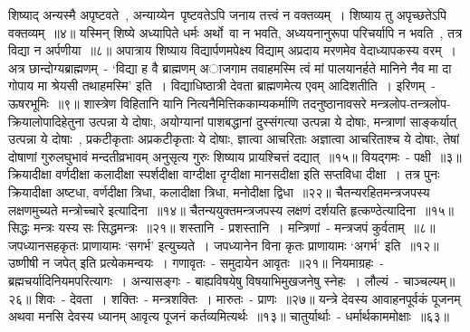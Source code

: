 \indent  शिष्याद् अन्यस्मै अपृष्टवते~, अन्याय्येन\footB\ पृष्टवतेऽपि जनाय तत्त्वं न वक्तव्यम्~। शिष्याय तु अपृच्छतेऽपि वक्तव्यम्~॥४॥
\indent  यस्मिन् शिष्ये अध्यापिते धर्मः अर्थो\footB\  वा न भवति, अध्ययनानुरूपा परिचर्यापि न भवति~, तत्र विद्या न अर्पणीया~॥८॥
\indent  अपात्राय शिष्याय विद्यार्पणमपेक्ष्य  विद्याम् अप्रदाय मरणमेव वेदाध्यापकस्य वरम्~। अत्र छान्दोग्यब्राह्मणम्~- ‘विद्या ह वै ब्राह्मणम् अाजगाम तवाहमस्मि त्वं मां पालयानर्हते मानिने नैव मा दा गोपाय मा श्रेयसी तथाहमस्मि’ इति~। विद्याधिष्ठात्री देवता ब्राह्मणमेत्य एवम् आदिशतीति~। इरिणम्~- ऊषरभूमिः~॥९॥
\indent शास्त्रेण विहितानि यानि नित्यनैमित्तिककाम्यकर्माणि तदनुष्ठानावसरे मन्त्रलोप-तन्त्रलोप-क्रियालोपादिहेतुना  उत्पन्ना ये दोषाः, अयोग्यानां पाशबद्धानां दुस्संगत्या  उत्पन्ना ये दोषाः, मन्त्राणां साङ्कर्यात् उत्पन्ना ये दोषाः~, प्रकटीकृताः अप्रकटीकृताः ये दोषाः, ज्ञात्वा आचरिताः अज्ञात्वा  आचरिताश्च ये दोषाः, तेषां दोषाणां गुरुलघुभावं मन्दतीव्रभावम् अनुसृत्य गुरुः शिष्याय प्रायश्चित्तं  दद्यात्~॥१५॥
\indent वियद्गमः~- पक्षी~॥३॥
\indent  क्रियादीक्षा वर्णदीक्षा कलादीक्षा स्पर्शदीक्षा वाग्दीक्षा दृग्दीक्षा मानसदीक्षा इति सप्तविधा दीक्षा~। तत्र पुनः क्रियादीक्षा अष्टधा, वर्णदीक्षा त्रिधा, कलादीक्षा त्रिधा, मनोदीक्षा द्विधा~॥२२॥
\indent चैतन्यरहितमन्त्रजपस्य लक्षणमुच्यते मन्त्रोच्चारे इत्यादिना~॥१४॥
\indent चैतन्ययुक्तमन्त्रजपस्य लक्षणं दर्शयति हृत्कण्ठेत्यादिना~॥१५॥
\indent सिद्धः मन्त्रः यस्य सः सिद्धमन्त्रः~॥२१॥
\indent शस्तानि~- प्रशस्तानि~। मन्त्रिणां~- मन्त्रजपं कुर्वताम्~॥८॥
\indent जपध्यानसहकृतः प्राणायामः ‘सगर्भ’ इत्युच्यते~। जपध्यानेन विना कृतः प्राणायामः ‘अगर्भ’ इति~॥१२॥
\indent उष्णीषी न जपेत् इति प्रत्येकमन्वयः~। गणावृतः~- समुदायेन आवृतः~॥२१॥
\indent नियमाग्रहः~- ब्रह्मचर्यादिनियमपरित्यागः~। अन्यासङ्गः~- बाह्यविषयेषु विषयाभिमुखजनेषु स्नेहः~। लौल्यं~- चाञ्चल्यम्॥२६॥
\indent शिवः~- देवता~। शक्तिः~- मन्त्रशक्तिः~। मारुतः~- प्राणः~॥२७॥
\indent यन्त्रे देवस्य आवाहनपूर्वकं पूजनम् अथवा मनसि देवस्य ध्यानम् आवृत्य पूजनं कर्तव्यमित्यर्थः~॥१३॥
\indent चातुर्यार्थाः~- धर्मार्थकाममोक्षाः~॥६३॥
